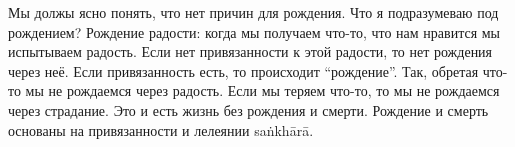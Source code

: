 Мы должы ясно понять, что нет причин для рождения. Что я подразумеваю под рождением? Рождение радости: когда мы получаем что-то, что нам нравится мы испытываем радость. Если нет привязанности к этой радости, то нет рождения через неё. Если привязанность есть, то происходит “рождение”. Так, обретая что-то мы не рождаемся через радость. Если мы теряем что-то, то мы не рождаемся через страдание. Это и есть жизнь без рождения и смерти. Рождение и смерть основаны на привязанности и лелеянии sa\.nkh\={a}r\={a}.



